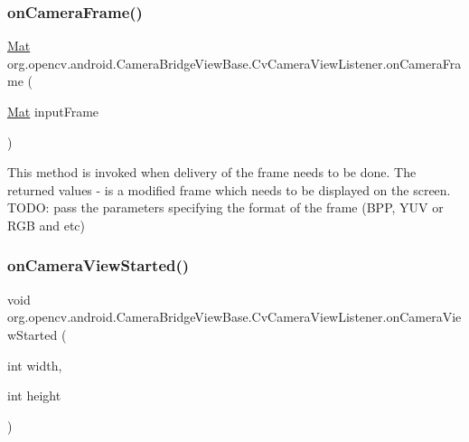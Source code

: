 \subsubsection{\texorpdfstring{on\+Camera\+Frame()}{onCameraFrame()}}
{\footnotesize\ttfamily \mbox{\hyperlink{classorg_1_1opencv_1_1core_1_1_mat}{Mat}} org.\+opencv.\+android.\+Camera\+Bridge\+View\+Base.\+Cv\+Camera\+View\+Listener.\+on\+Camera\+Frame (\begin{DoxyParamCaption}\item[{\mbox{\hyperlink{classorg_1_1opencv_1_1core_1_1_mat}{Mat}}}]{input\+Frame }\end{DoxyParamCaption})}

This method is invoked when delivery of the frame needs to be done. The returned values -\/ is a modified frame which needs to be displayed on the screen. T\+O\+DO\+: pass the parameters specifying the format of the frame (B\+PP, Y\+UV or R\+GB and etc) \mbox{\label{interfaceorg_1_1opencv_1_1android_1_1_camera_bridge_view_base_1_1_cv_camera_view_listener_a7f908e34834761c8c1d6622989bb5a90}} 
\subsubsection{\texorpdfstring{on\+Camera\+View\+Started()}{onCameraViewStarted()}}
{\footnotesize\ttfamily void org.\+opencv.\+android.\+Camera\+Bridge\+View\+Base.\+Cv\+Camera\+View\+Listener.\+on\+Camera\+View\+Started (\begin{DoxyParamCaption}\item[{int}]{width,  }\item[{int}]{height }\end{DoxyParamCaption})}

